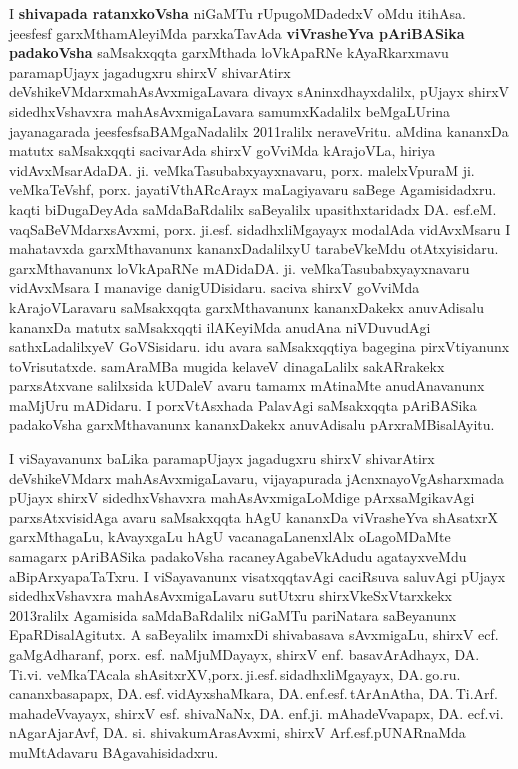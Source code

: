 I \textbf{shivapada ratanxkoVsha} niGaMTu rUpugoMDadedxV oMdu itihAsa. jeesfesf garxMthamAleyiMda parxkaTavAda \textbf{\hbox{viVrasheYva} pAriBASika padakoVsha} saMsakxqqta garxMthada loVkApaRNe kAyaRkarxmavu paramapUjayx jagadugxru shirxV shivarAtirx deVshikeVMdarx\break mahA\-sAvxmigaLavara divayx sAninxdhayxdalilx, pUjayx shirxV sidedhxVshavxra mahAsAvxmigaLavara samumxKadalilx beMgaLUrina jayanagarada jeesfesf\break saBAMgaNadalilx 2011ralilx neraveVritu. aMdina kananxDa matutx saMsakxqqti sacivarAda shirxV goVviMda \hbox{kArajoVLa}, hiriya vidAvxMsarAda\break DA. ji. veMkaTasubabxyayxnavaru, porx. malelxVpuraM ji. veMkaTeVshf, porx. jayatiVthARcArayx maLagiyavaru saBege Agamisidadxru. kaqti biDugaDeyAda saMdaBaRdalilx saBeyalilx upasithxtaridadx DA. esf.eM. vaqSaBeVMdarx\-sAvxmi, porx. ji.esf. sidadhx\-liMgayayx modalAda vidAvxMsaru I mahatavxda garxMthavanunx kananxDadalilxyU tarabeVkeMdu otAtxyisidaru. garxMthavanunx loVkApaRNe mADida\break DA. ji. veMkaTasubabxyayxnavaru \hbox{vidAvxMsara} I manavige danigUDisidaru. saciva shirxV goVviMda kArajoVLaravaru saMsakxqqta garxMtha\-vanunx kananxDakekx anuvAdisalu kananxDa matutx saMsakxqqti ilAKeyiMda anudAna niVDuvudAgi sathxLadalilxyeV GoVSi\-sidaru. idu avara saMsakxqqtiya bagegina pirxVtiyanunx toVrisutatxde. samAraMBa mugida kelaveV dinagaLalilx sakARrakekx parxsAtxvane salilxsida kUDaleV avaru tamamx mAtinaMte anudAnavanunx maMjUru mADidaru. I porxVtAsxhada PalavAgi saMsakxqqta pAriBASika padakoVsha garxMthavanunx kananxDakekx anuvAdisalu pArxraMBisalAyitu.

\medskip

I viSayavanunx baLika paramapUjayx jagadugxru shirxV shivarAtirx deVshikeVMdarx mahAsAvxmigaLavaru, vijayapurada jAcnxna\-yoVgAsharxmada pUjayx shirxV sidedhxVshavxra mahAsAvxmigaLoMdige  pArxsaMgikavAgi parxsAtxvisidAga avaru saMsakxqqta hAgU kananxDa \hbox{viVrasheYva} shAsatxrX garxMthagaLu, kAvayxgaLu hAgU vacanagaLanenxlAlx oLagoMDaMte samagarx pAriBASika padakoVsha racaneyAgabeVkAdudu agatayxveMdu  aBipArxyapaTaTxru. I viSayavanunx visatxqqtavAgi caciRsuva saluvAgi pUjayx sidedhxVshavxra mahAsAvxmigaLavaru \hbox{sutUtxru} shirxVkeSxVtarxkekx 2013ralilx Agamisida saMdaBaRdalilx niGaMTu pariNatara saBeyanunx EpaRDisalAgitutx. A saBeyalilx imamxDi shivabasava sAvxmigaLu, shirxV ecf. gaMgAdharanf, porx. esf. naMjuMDayayx, shirxV enf. \hbox{basavArAdhayx}, DA. Ti.vi. veMkaTAcala shAsitxrXV,\break porx.\,ji.esf.\,sidadhxliMgayayx, DA.\,go.ru.\,cananxbasapapx, DA.\,esf.\,vidAyxshaMkara, DA.\,enf.esf.\,tArAnAtha, \hbox{DA.\,Ti.Arf.\,mahadeVvayayx}, shirxV esf. shivaNaNx, DA. enf.ji. mAhadeVvapapx, DA. ecf.vi. nAgarAjarAvf, DA. si. shivakumArasAvxmi, shirxV Arf.esf.\break pUNARnaMda muMtAdavaru BAgavahisidadxru.

